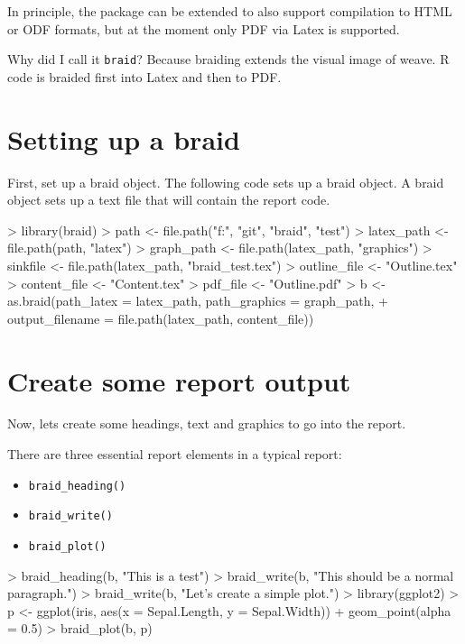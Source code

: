 \documentclass[a4paper]{article}
\newcommand{\braid}{{\tt braid}}
\newcommand{\code}[1]{{\tt #1}}
\begin{document}
In principle, the package can be extended to also support compilation to HTML or ODF formats, but at the moment only PDF via Latex is supported.

Why did I call it \braid{}?  Because braiding extends the visual image of weave. R code is braided first into Latex and then to PDF. 


\section{Setting up a braid}

First, set up a braid object.  The following code sets up a braid object.  A braid object sets up a text file that will contain the report code.

\begin{Schunk}
\begin{Sinput}
> library(braid)
> path <- file.path("f:", "git", "braid", "test")
> latex_path <- file.path(path, "latex")
> graph_path <- file.path(latex_path, "graphics")
> sinkfile <- file.path(latex_path, "braid_test.tex")
> outline_file <- "Outline.tex"
> content_file <- "Content.tex"
> pdf_file <- "Outline.pdf"
> b <- as.braid(path_latex = latex_path, path_graphics = graph_path, 
+     output_filename = file.path(latex_path, content_file))
\end{Sinput}
\end{Schunk}

\section{Create some report output}

Now, lets create some headings, text and graphics to go into the report.

There are three essential report elements in a typical report:

\begin{itemize}
	\item \code{braid\_heading()}
	\item \code{braid\_write()}
	\item \code{braid\_plot()}
\end{itemize}


\begin{Schunk}
\begin{Sinput}
> braid_heading(b, "This is a test")
> braid_write(b, "This should be a normal paragraph.")
> braid_write(b, "Let's create a simple plot.")
> library(ggplot2)
> p <- ggplot(iris, aes(x = Sepal.Length, y = Sepal.Width)) + geom_point(alpha = 0.5)
> braid_plot(b, p)
\end{Sinput}
\end{Schunk}
\end{document}

